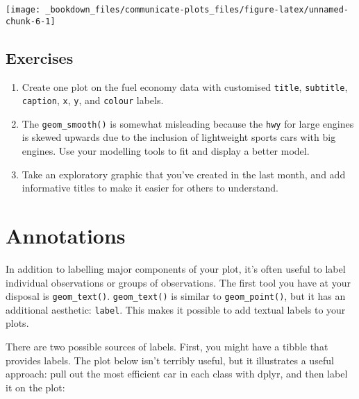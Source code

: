 \documentclass[]{book}
\newenvironment{Shaded}{\begin{snugshade}}{\end{snugshade}}
\newcommand{\KeywordTok}[1]{\textcolor[rgb]{0.13,0.29,0.53}{\textbf{{#1}}}}
\newcommand{\DataTypeTok}[1]{\textcolor[rgb]{0.13,0.29,0.53}{{#1}}}
\newcommand{\DecValTok}[1]{\textcolor[rgb]{0.00,0.00,0.81}{{#1}}}
\newcommand{\StringTok}[1]{\textcolor[rgb]{0.31,0.60,0.02}{{#1}}}
\newcommand{\NormalTok}[1]{{#1}}
\begin{document}
\begin{center}\texttt{[image: \_bookdown\_files/communicate-plots\_files/figure-latex/unnamed-chunk-6-1]} \end{center}

\subsection{Exercises}\label{exercises-71}

\begin{enumerate}
\def\labelenumi{\arabic{enumi}.}
\item
  Create one plot on the fuel economy data with customised
  \texttt{title}, \texttt{subtitle}, \texttt{caption}, \texttt{x},
  \texttt{y}, and \texttt{colour} labels.
\item
  The \texttt{geom\_smooth()} is somewhat misleading because the
  \texttt{hwy} for large engines is skewed upwards due to the inclusion
  of lightweight sports cars with big engines. Use your modelling tools
  to fit and display a better model.
\item
  Take an exploratory graphic that you've created in the last month, and
  add informative titles to make it easier for others to understand.
\end{enumerate}

\section{Annotations}\label{annotations}

In addition to labelling major components of your plot, it's often
useful to label individual observations or groups of observations. The
first tool you have at your disposal is \texttt{geom\_text()}.
\texttt{geom\_text()} is similar to \texttt{geom\_point()}, but it has
an additional aesthetic: \texttt{label}. This makes it possible to add
textual labels to your plots.

There are two possible sources of labels. First, you might have a tibble
that provides labels. The plot below isn't terribly useful, but it
illustrates a useful approach: pull out the most efficient car in each
class with dplyr, and then label it on the plot:

\begin{Shaded}
\end{Shaded}
\end{document}

